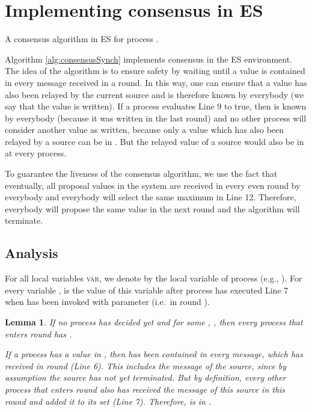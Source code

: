 \documentclass[conference, compsoc]{IEEEtran}
\newtheorem{lemma}{Lemma}
\def\val{\textsc{val}}
\begin{document}
\section{Implementing consensus in ES} \label{sec:Cons}

\begin{algorithm}[htb] 
       {\small
{}
\SetVline
       
	
\On{}{
	\;
	\; 
	\If{}{
		\uIf{}{ 
			\textbf{decide} \val; \textbf{halt} 
		}	
		\ElseIf{}{
			\;
		}	
		\;
	}
	\;
	\Return \;
}


\caption{A consensus algorithm in ES for process .}
\label{alg:consensusSynch}
}
\end{algorithm}  


Algorithm \ref{alg:consensusSynch} implements consensus in the ES environment. The idea of the algorithm is to ensure safety by waiting until a value is contained in every message received in a round. In this way, one can ensure that a value has also been relayed by the current source and is therefore known by everybody (we say that the value is written). If a process evaluates Line 9 to true, then  is known by everybody (because it was written in the last round) and no other process will consider another value as written, because only a value which has also been relayed by a source can be in . But the relayed value of a source would also be in  at every process. 

To guarantee the liveness of the consensus algorithm, we use the fact that eventually, all proposal values in the system are received in every even round by everybody and everybody will select the same maximum in Line 12. Therefore, everybody will propose the same value in the next round and the algorithm will terminate.

\subsection{Analysis}

For all local variables \textsc{var}, we denote by  the local variable of process  (e.g., ). For every variable ,  is the value of this variable after process  has executed Line 7 when  has been invoked with parameter  (i.e.~in round ). 

\begin{lemma}
 \label{lem:nootherwrites}
 If no process has decided yet and for some , , then every process  that enters round  has .
 \begin{IEEEproof}  
  If a process  has a value  in , then  has been contained in every message, which  has received in round  (Line 6). This includes the message of the source, since by assumption the source has not yet terminated. But by definition, every other process  that enters round  also has received the message of this source in this round and added it to its set  (Line 7). Therefore,  is in .  
 \end{IEEEproof}
\end{lemma}
\end{document}
